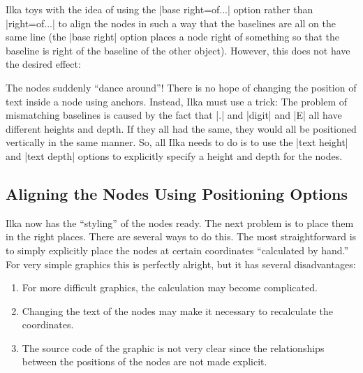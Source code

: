 Ilka toys with the idea of using the |base right=of...| option rather than
|right=of...| to align the nodes in such a way that the baselines
are all on the same line (the |base right| option places a node
right of something so that the baseline is right of the baseline of
the other object). However, this does not have the desired effect:
\begin{codeexample}[]
\end{codeexample}
The nodes suddenly ``dance around''! There is no hope of changing the
position of text inside a node using anchors. Instead, Ilka must use a
trick: The problem of mismatching baselines is caused by the fact that
|.| and |digit| and |E| all have different heights and depth. If they
all had the same, they would all be positioned vertically in the same
manner. So, all Ilka needs to do is to use the |text height| and
|text depth| options to explicitly specify a height and depth for the
nodes.
\begin{codeexample}[]
\end{codeexample}



\subsection{Aligning  the Nodes Using Positioning Options}

Ilka now has the ``styling'' of the nodes ready. The next problem is
to place them in the right places. There are several ways to do
this. The most straightforward is to simply explicitly place the nodes
at certain coordinates ``calculated by hand.'' For very simple
graphics this is perfectly alright, but it has several disadvantages:
\begin{enumerate}
\item For more difficult graphics, the calculation may become
  complicated.
\item Changing the text of the nodes may make it necessary to
  recalculate the coordinates.
\item The source code of the graphic is not very clear since the
  relationships between the positions of the nodes are not made
  explicit. 
\end{enumerate}

